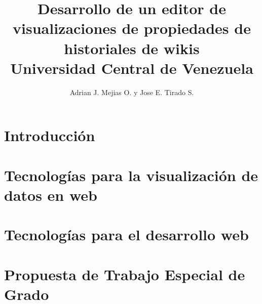 \documentclass[12pt]{report}
\title{
	{Desarrollo de un editor de visualizaciones de propiedades de historiales de wikis}\\
	{\large Universidad Central de Venezuela}\\
}
\author{Adrian J. Mejias O. y Jose E. Tirado S.}
\begin{document}


\tableofcontents

\listoffigures

\chapter{Introducción}


\chapter{Tecnologías para la visualización de datos en web}


\chapter{Tecnologías para el desarrollo web}


\chapter{Propuesta de Trabajo Especial de Grado}


\printbibliography
\end{document}
